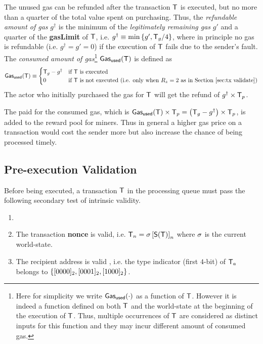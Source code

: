 	The unused gas can be refunded after the transaction $\textsf{T}$ is executed, but no more than a quarter of the total value spent on purchasing. 
	Thus, the \emph{refundable amount of gas} $g^{\dagger}$ is the minimum of the \emph{legitimately remaining gas} $g'$ and a quarter of the \textbf{gasLimit} of $\textsf{T}$,
	i.e. $g^{\dagger}\equiv \min{\left \{{g', \textsf{T}_g/4} \right \}}$, 
	where in principle no gas is refundable (i.e. $g^{\dagger} = g' = 0$) if the execution of $\textsf{T}$ fails due to the sender's fault. 
	The \emph{consumed amount of gas}\footnote{Here for simplicity we write $\mathsf{Gas_{used}}(\cdot)$ as a function of $\textsf{T}$. However it is indeed a function defined on both $\textsf{T}$ and the world-state at the beginning of the execution of $\textsf{T}$. Thus, multiple occurrences of $\textsf{T}$ are considered as distinct inputs for this function and they may incur different amount of consumed gas.} $\mathsf{Gas_{used}}(\textsf{T})$ is defined as
	\begin{align*}
		\mathsf{Gas_{used}}(\textsf{T}) \equiv \begin{cases}
			\textsf{T}_g-g^{\dagger} & \mbox{if $\textsf{T}$ is executed}\\
			0 & \mbox{if $\textsf{T}$ is not executed (i.e. only when $R_z=2$ as in Section~\ref{sec:tx validate})}
		\end{cases} 
	\end{align*}
	The actor who initially purchased the gas for $\textsf{T}$ will get the refund of $g^{\dagger}\times\textsf{T}_p$.

The \coinsign paid for the consumed gas, which is $\mathsf{Gas_{used}}(\textsf{T})\times\textsf{T}_p = \left(\textsf{T}_g-g^{\dagger}\right)\times \textsf{T}_p$, is added to the reward pool for miners. 
Thus in general a higher gas price on a transaction would cost the sender more but also increase the chance of being processed timely.

\subsection{Pre-execution Validation}
\label{sec:tx validate}

Before being executed, a transaction $\textsf{T}$ in the processing queue must pass the following secondary test of intrinsic validity. 
\begin{enumerate}[nosep]
	\item {}
	
	\item The transaction \textbf{nonce} is valid,
   i.e. $\textsf{T}_n = \mathbf{\sigma}\left[\mathsf{S}{\left({\textsf{T}} \right)}\right]_n$ where $\mathbf{\sigma}$ is the current world-state.

   \item The recipient address is valid , i.e. the type indicator (first $4$-bit) of $\textsf{T}_a$ belongs to ${\left \{{[0000]_2,[0001]_2,[1000]_2} \right \}}$.
\end{enumerate}


